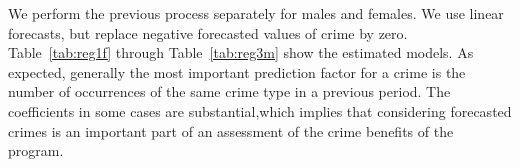 %

%

\noindent We perform the previous process separately for males and females. We use linear forecasts, but replace negative forecasted values of crime by zero. Table~\ref{tab:reg1f} through Table~\ref{tab:reg3m} show the estimated models. As expected, generally the most important prediction factor for a crime is the number of occurrences of the same crime type in a previous period. The coefficients in some cases are substantial,which implies that considering forecasted crimes is an important part of an assessment of the crime benefits of the program.

